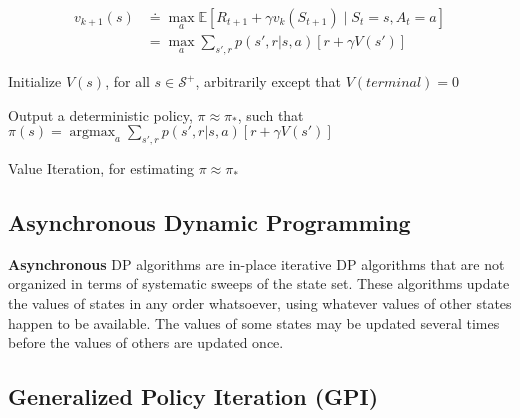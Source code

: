 \documentclass[11pt]{article}
\DeclareMathOperator*{\argmax}{argmax}
\begin{document}
\begin{equation}
\begin{aligned}
v_{k+1}(s) &\doteq \max_{a} \mathbb{E}[R_{t+1} + \gamma v_{k}(S_{t+1}) \mid S_{t}=s, A_{t}=a]\\
           &= \max_{a} \sum_{s',r}p(s',r|s,a)[r+\gamma V(s')]
\end{aligned}
\end{equation}
\newline
\newline
\begin{algorithm}[H]
Initialize $V(s)$, for all $s \in \mathcal{S}^{+}$, arbitrarily except that $V(terminal) = 0$ \\
\;

\;

Output a deterministic policy, $\pi \approx \pi_{*}$, such that\\
$\pi(s) = \argmax_{a} \sum_{s',r}p(s',r|s,a)[r+\gamma V(s')]$

\caption{Value Iteration, for estimating $\pi \approx \pi_{*}$}
\end{algorithm}

\subsection{Asynchronous Dynamic Programming}
\label{sec:orga2e4b2e}

\textbf{Asynchronous} DP algorithms are in-place iterative DP algorithms that are not
organized in terms of systematic sweeps of the state set. These algorithms
update the values of states in any order whatsoever, using whatever values of
other states happen to be available. The values of some states may be updated
several times before the values of others are updated once.

\subsection{Generalized Policy Iteration (GPI)}
\label{sec:orgbe7a0c3}
\end{document}
